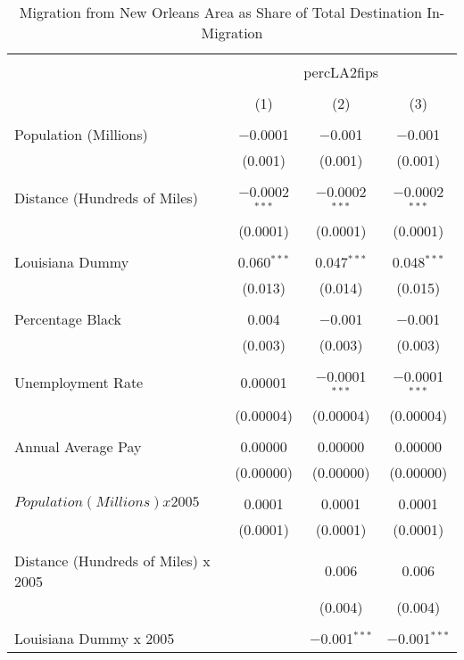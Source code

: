 \documentclass[]{article}
\begin{document}
\begin{table}[!htbp] \scriptsize \centering 
  \caption{Migration from New Orleans Area as Share of Total Destination In-Migration} 
  \label{} 
\begin{tabular}{@{\extracolsep{5pt}}lccc} 
\\[-1.8ex]\hline 
\\[-1.8ex] & \multicolumn{3}{c}{percLA2fips} \\ 
\\[-1.8ex] & (1) & (2) & (3)\\ 
\hline \\[-1.8ex] 
 Population (Millions) & $-$0.0001 & $-$0.001 & $-$0.001 \\ 
  & (0.001) & (0.001) & (0.001) \\ 
  & & & \\ 
 Distance (Hundreds of Miles) & $-$0.0002$^{***}$ & $-$0.0002$^{***}$ & $-$0.0002$^{***}$ \\ 
  & (0.0001) & (0.0001) & (0.0001) \\ 
  & & & \\ 
 Louisiana Dummy & 0.060$^{***}$ & 0.047$^{***}$ & 0.048$^{***}$ \\ 
  & (0.013) & (0.014) & (0.015) \\ 
  & & & \\ 
 Percentage Black & 0.004 & $-$0.001 & $-$0.001 \\ 
  & (0.003) & (0.003) & (0.003) \\ 
  & & & \\ 
 Unemployment Rate & 0.00001 & $-$0.0001$^{***}$ & $-$0.0001$^{***}$ \\ 
  & (0.00004) & (0.00004) & (0.00004) \\ 
  & & & \\ 
 Annual Average Pay & 0.00000 & 0.00000 & 0.00000 \\ 
  & (0.00000) & (0.00000) & (0.00000) \\ 
  & & & \\ 
 $Population (Millions) x 2005$ & 0.0001 & 0.0001 & 0.0001 \\ 
  & (0.0001) & (0.0001) & (0.0001) \\ 
  & & & \\ 
 Distance (Hundreds of Miles) x 2005 &  & 0.006 & 0.006 \\ 
  &  & (0.004) & (0.004) \\ 
  & & & \\ 
 Louisiana Dummy x 2005 &  & $-$0.001$^{***}$ & $-$0.001$^{***}$ \\ 

\end{tabular}
\end{table}
\end{document}
